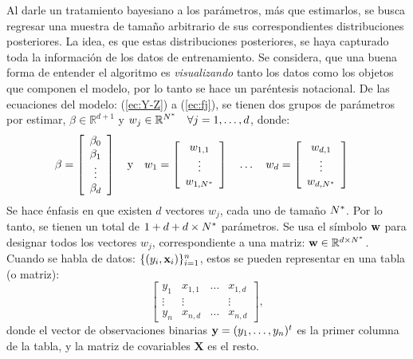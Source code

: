 \documentclass[../Main/Main.tex]{subfiles}
\begin{document}
Al darle un tratamiento bayesiano a los parámetros, más que estimarlos, se busca regresar una muestra de tamaño arbitrario de sus correspondientes distribuciones posteriores. La idea, es que estas distribuciones posteriores, se haya capturado toda la información de los datos de entrenamiento. Se considera, que una buena forma de entender el algoritmo es \textit{visualizando} tanto los datos como los objetos que componen el modelo, por lo tanto se hace un paréntesis notacional. De las ecuaciones del modelo: (\ref{ec:Y-Z}) a (\ref{ec:fj}), se tienen dos grupos de parámetros por estimar, $\beta \in \mathbb{R}^{d+1}$ y $w_j \in \mathbb{R}^{N^*} \quad \forall j = 1,\ldots,d$, donde:
\begin{align}
\beta &= 
\left[ 
	\begin{array}{c}
	\beta_0 \\
	\beta_1 \\ 
	\vdots \\
	\beta_d
	\end{array}\right]
\quad \text{y} \quad 
w_1 = 
\left[ 
	\begin{array}{c}
	w_{1,1}\\
	\vdots\\
	w_{1,N^*}
	\end{array}\right]
\quad \ldots \quad 
w_d = 
\left[ 
	\begin{array}{c}
	w_{d,1}\\
	\vdots\\
	w_{d,N^*}
	\end{array}\right]
\end{align}
Se hace énfasis en que existen $d$ vectores $w_j$, cada uno de tamaño $N^*$. Por lo tanto, se tienen un total de $1 + d + d\times N^*$ parámetros. Se usa el símbolo $\mathbf{w}$ para designar todos los vectores $w_j$, correspondiente a una matriz: $\mathbf{w}\in\mathbb{R}^{d\times N^*}$. Cuando se habla de datos: $\{(y_i,\mathbf{x}_i)\}_{i = 1}^n$, estos se pueden  representar en una tabla (o matriz):
$$\left[\begin{array}{c|ccc} 
y_1 & x_{1,1} & \ldots & x_{1,d} \\ 
\vdots & \vdots & ~ & \vdots \\ 
y_n & x_{n,d} & \ldots & x_{n,d}
\end{array}\right],$$
donde el vector de observaciones binarias $\mathbf{y} = (y_1,\ldots,y_n)^t$ es la primer columna de la tabla, y la matriz de covariables $\mathbf{X}$ es el resto.
\end{document}
